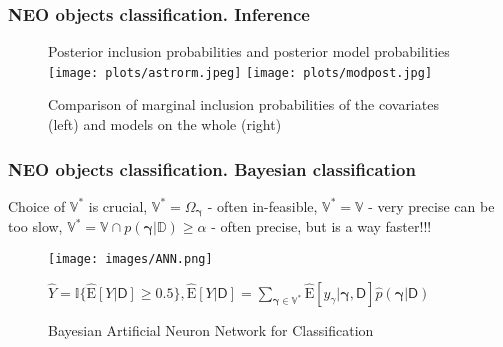 \documentclass{beamer}
\begin{document}
\begin{frame}
\frametitle{NEO objects classification. Inference}
\begin{figure}
Posterior inclusion probabilities and posterior model probabilities
\texttt{[image: plots/astrorm.jpeg]}
\texttt{[image: plots/modpost.jpg]}
\caption{Comparison of marginal inclusion probabilities of the covariates (left) and models on the whole (right)}
\end{figure}

\end{frame}


\begin{frame}
\frametitle{NEO objects classification. Bayesian classification}
Choice of $\mathbb{V}^*$ is crucial, $\mathbb{V}^*=\Omega_{\boldsymbol{\gamma}}$ - often in-feasible, $\mathbb{V}^*=\mathbb{V}$ - very precise can be too slow, $\mathbb{V}^*= \mathbb{V}\cap p(\boldsymbol{\gamma}|\mathbb{D})\geq\alpha$ - often precise, but is a way faster!!!
\begin{figure}
\texttt{[image: images/ANN.png]}
\caption{Bayesian Artificial Neuron Network for Classification}
 $\hat{Y}=\mathbb{I}\{\hat{\text{E}}[Y|\boldsymbol{\mathsf{D}}]\geq0.5\},  \hat{\text{E}}[Y|\boldsymbol{\mathsf{D}}]=  \sum_{\boldsymbol{\boldsymbol{\gamma}} \in  \mathbb{V}^*}{\hat{\text{E}}[y_{\gamma}|\boldsymbol{\gamma},\boldsymbol{\mathsf{D}}]\hat{p}(\boldsymbol{\gamma}|\boldsymbol{\mathsf{D}})}$
\end{figure}

\end{frame}
\end{document}
